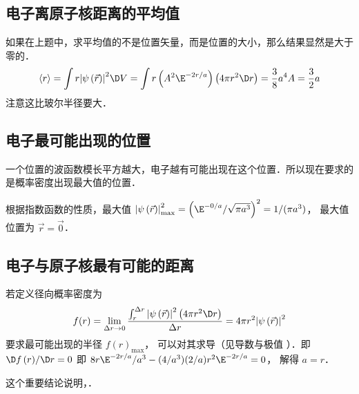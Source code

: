 \subsection{电子离原子核距离的平均值}

如果在上题中，求平均值的不是位置矢量，而是位置的大小，那么结果显然是大于零的．
\begin{equation}
 \left\langle r \right\rangle = \int {r{{\left| {\psi \left( {\vec r} \right)} \right|}^2} \D V} = \int {r \left(A^2 \E^{-2r/a}\right)\left( {4\pi {r^2} \D r} \right)}= \frac{3}{8}{a^4}A = \frac{3}{2}a
\end{equation}
注意这比玻尔半径要大．

\subsection{电子最可能出现的位置}

 一个位置的波函数模长平方越大，电子越有可能出现在这个位置．所以现在要求的是概率密度出现最大值的位置．
 
 根据指数函数的性质，最大值 $\left| {\psi \left( {\vec r} \right)} \right|_{\max }^2 ={\left( {\E^{-0/a}}/{{\sqrt {\pi {a^3}} }} \right)^2} = {1}/({{\pi {a^3}}})$， 最大值位置为 $\vec r = \vec 0$． 

\subsection{电子与原子核最有可能的距离}
若定义径向概率密度为
\begin{equation}
f(r) = \lim_{\Delta r \to 0} \frac{{\int_r^{\Delta r} {{{\left| {\psi \left( {\vec r} \right)} \right|}^2}\left( {4\pi {r^2} \D r} \right)} }}{{\Delta r}} = 4\pi {r^2}{\left| {\psi \left( {\vec r} \right)} \right|^2}
  \end{equation}
  要求最可能出现的半径 $f{\left( r \right)_{\max }}$，  可以对其求导（见导数与极值%
  ）．即 ${{ \D f\left( r \right)}}/{{ \D r}} = 0$ 即 ${8 r{\E^{-2r/a}}}/{{{a^3}}} - ({4}/{{{a^3}}})({2}/{a}){r^2}{\E^{-2r/a}} = 0$， 解得 $a = r$． 
 
这个重要结论说明，．
